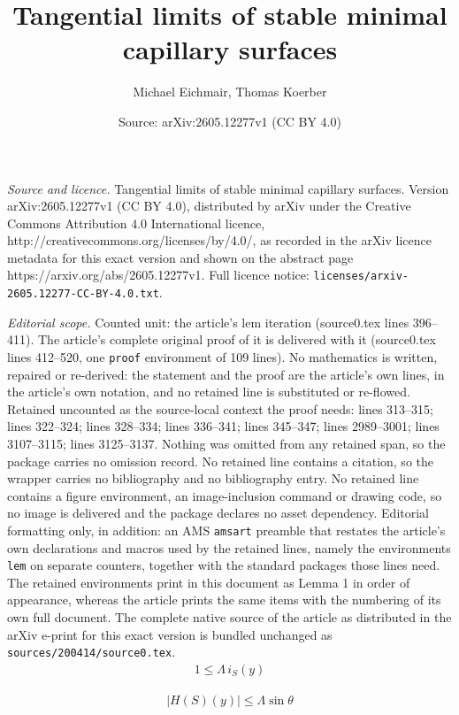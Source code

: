 \documentclass[10pt,a4paper]{amsart}
\title{Tangential limits of stable minimal capillary surfaces}
\author{Michael Eichmair, Thomas Koerber}
\date{Source: arXiv:2605.12277v1 (CC BY 4.0)}
\begin{document}
\maketitle

\noindent\emph{Source and licence.} Tangential limits of stable minimal capillary surfaces. Version arXiv:2605.12277v1 (CC BY 4.0), distributed by arXiv under the Creative Commons Attribution 4.0 International licence, http://creativecommons.org/licenses/by/4.0/, as recorded in the arXiv licence metadata for this exact version and shown on the abstract page https://arxiv.org/abs/2605.12277v1. Full licence notice: \texttt{licenses/arxiv-2605.12277-CC-BY-4.0.txt}.\par\smallskip

\noindent\textit{Editorial scope.} Counted unit: the article's lem iteration (source0.tex lines 396--411). The article's complete original proof of it is delivered with it (source0.tex lines 412--520, one \texttt{proof} environment of 109 lines). No mathematics is written, repaired or re-derived: the statement and the proof are the article's own lines, in the article's own notation, and no retained line is substituted or re-flowed.  Retained uncounted as the source-local context the proof needs: lines 313--315; lines 322--324; lines 328--334; lines 336--341; lines 345--347; lines 2989--3001; lines 3107--3115; lines 3125--3137.  Nothing was omitted from any retained span, so the package carries no omission record.  No retained line contains a citation, so the wrapper carries no bibliography and no bibliography entry.  No retained line contains a figure environment, an image-inclusion command or drawing code, so no image is delivered and the package declares no asset dependency.  Editorial formatting only, in addition: an AMS \texttt{amsart} preamble that restates the article's own declarations and macros used by the retained lines, namely the environments \texttt{lem} on separate counters, together with the standard packages those lines need.  The retained environments print in this document as Lemma 1 in order of appearance, whereas the article prints the same items with the numbering of its own full document.  The complete native source of the article as distributed in the arXiv e-print for this exact version is bundled unchanged as \texttt{sources/200414/source0.tex}.
	\begin{align} \label{geometry bound} 
	1\leq \Lambda\,i_S(y)
	\end{align} 

	\begin{align} \label{H bound} 
	|H(S)(y)|\leq \Lambda\sin\theta
	\end{align} 
\end{document}
